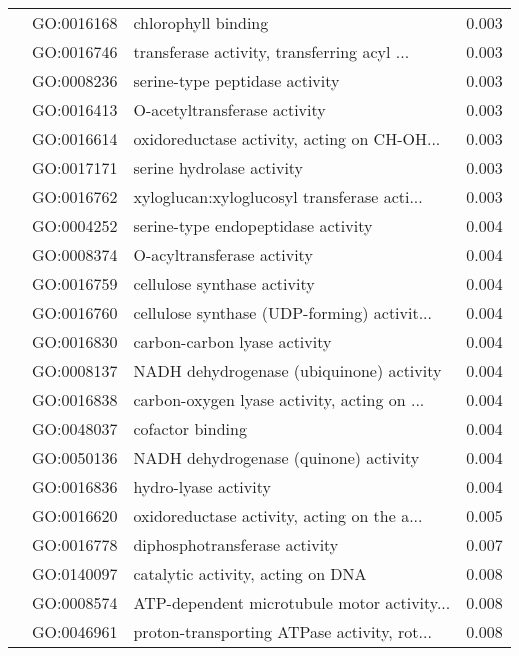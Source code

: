 \begin{longtable}{lllr}
   & GO:0016168 &                          chlorophyll binding &         0.003 \\
   & GO:0016746 &  transferase activity, transferring acyl ... &         0.003 \\
   & GO:0008236 &               serine-type peptidase activity &         0.003 \\
   & GO:0016413 &                 O-acetyltransferase activity &         0.003 \\
   & GO:0016614 &  oxidoreductase activity, acting on CH-OH... &         0.003 \\
   & GO:0017171 &                    serine hydrolase activity &         0.003 \\
   & GO:0016762 &  xyloglucan:xyloglucosyl transferase acti... &         0.003 \\
   & GO:0004252 &           serine-type endopeptidase activity &         0.004 \\
   & GO:0008374 &                   O-acyltransferase activity &         0.004 \\
   & GO:0016759 &                  cellulose synthase activity &         0.004 \\
   & GO:0016760 &  cellulose synthase (UDP-forming) activit... &         0.004 \\
   & GO:0016830 &                 carbon-carbon lyase activity &         0.004 \\
   & GO:0008137 &     NADH dehydrogenase (ubiquinone) activity &         0.004 \\
   & GO:0016838 &  carbon-oxygen lyase activity, acting on ... &         0.004 \\
   & GO:0048037 &                             cofactor binding &         0.004 \\
   & GO:0050136 &        NADH dehydrogenase (quinone) activity &         0.004 \\
   & GO:0016836 &                         hydro-lyase activity &         0.004 \\
   & GO:0016620 &  oxidoreductase activity, acting on the a... &         0.005 \\
   & GO:0016778 &                diphosphotransferase activity &         0.007 \\
   & GO:0140097 &            catalytic activity, acting on DNA &         0.008 \\
   & GO:0008574 &  ATP-dependent microtubule motor activity... &         0.008 \\
   & GO:0046961 &  proton-transporting ATPase activity, rot... &         0.008 \\

\end{longtable}
